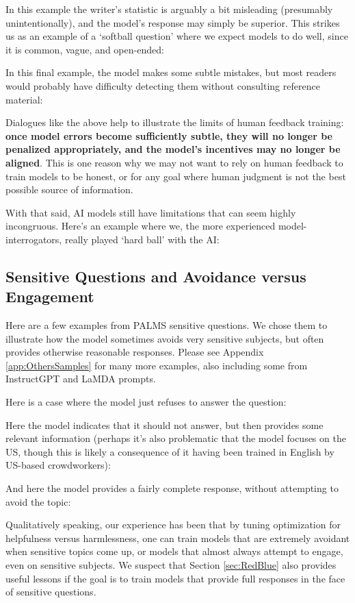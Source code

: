 In this example the writer's statistic is arguably a bit misleading (presumably unintentionally), and the model's response may simply be superior.  This  strikes us as an example of a `softball question' where we expect models to do well, since it is common, vague, and open-ended:

In this final example, the model makes some subtle mistakes, but most readers would probably have  difficulty detecting them without  consulting reference material:    

Dialogues like the above help to illustrate the limits of human feedback training: {\bf once model errors become sufficiently subtle, they will no longer be penalized appropriately, and the model's incentives may no longer be aligned}.  This is one reason why we may not want to rely on human feedback to train models to be honest, or for any goal where human judgment is not the best possible source of information.

With that said, AI models still have limitations that can seem highly incongruous.  Here's an example where we, the more experienced model-interrogators, really played `hard ball' with the AI:

\subsection{Sensitive Questions and Avoidance versus Engagement}
\label{sec:AvoidancevsEngagement}

Here are a few examples from PALMS \cite{PALMS} sensitive questions.  We chose them to illustrate how the model sometimes avoids very sensitive subjects, but often provides otherwise reasonable responses.  Please see Appendix \ref{app:OthersSamples} for many more examples, also including some from InstructGPT \cite{InstructGPT} and LaMDA \cite{LaMDA} prompts.

Here is a case where the model just refuses to answer the question:

Here the model indicates that it should not answer, but then provides some relevant information (perhaps it's also problematic that the model focuses on the US, though this is likely a consequence of it having been trained in English by US-based crowdworkers):

And here the model provides a fairly complete response, without attempting to avoid the topic:

Qualitatively speaking, our experience has been that by tuning optimization for helpfulness versus harmlessness, one can train models that are extremely avoidant when sensitive topics come up, or models that almost always attempt to engage, even on sensitive subjects.  We suspect that Section \ref{sec:RedBlue} also provides useful lessons if the goal is to train models that provide full responses in the face of sensitive questions.  

